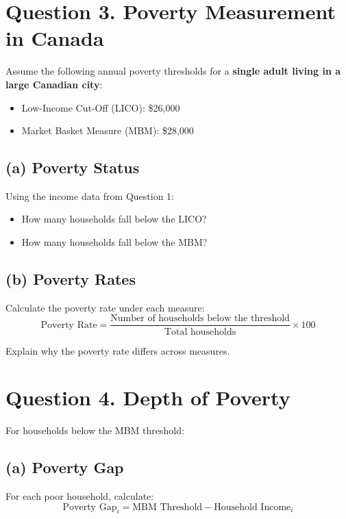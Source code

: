\documentclass[11pt]{article}
\begin{document}
\section*{Question 3. Poverty Measurement in Canada}

Assume the following annual poverty thresholds for a \textbf{single adult living in a large Canadian city}:

\begin{itemize}
\item Low-Income Cut-Off (LICO): \$26{,}000
\item Market Basket Measure (MBM): \$28{,}000
\end{itemize}

\subsection*{(a) Poverty Status}

Using the income data from Question 1:
\begin{itemize}
\item How many households fall below the LICO?
\item How many households fall below the MBM?
\end{itemize}

\subsection*{(b) Poverty Rates}

Calculate the poverty rate under each measure:
\[
\text{Poverty Rate} = \frac{\text{Number of households below the threshold}}{\text{Total households}} \times 100
\]

Explain why the poverty rate differs across measures.

\section*{Question 4. Depth of Poverty}

For households below the MBM threshold:

\subsection*{(a) Poverty Gap}

For each poor household, calculate:
\[
\text{Poverty Gap}_i = \text{MBM Threshold} - \text{Household Income}_i
\]
\end{document}

